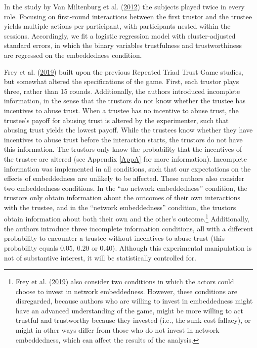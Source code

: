 \documentclass[
  11pt,
]{article}
\begin{document}
In the study by Van Miltenburg et al. (\protect\hyperlink{ref-miltenburg_buskens_triads_2012}{2012}) the subjects played twice in every role.
Focusing on first-round interactions between the first trustor and the trustee yields multiple actions per participant, with participants nested within the sessions.
Accordingly, we fit a logistic regression model with cluster-adjusted standard errors, in which the binary variables trustfulness and trustworthiness are regressed on the embeddedness condition.

Frey et al. (\protect\hyperlink{ref-frey_buskens_investments_2019}{2019}) built upon the previous Repeated Triad Trust Game studies, but somewhat altered the specifications of the game.
First, each trustor plays three, rather than 15 rounds.
Additionally, the authors introduced incomplete information, in the sense that the trustors do not know whether the trustee has incentives to abuse trust.
When a trustee has no incentive to abuse trust, the trustee's payoff for abusing trust is altered by the experimenter, such that abusing trust yields the lowest payoff.
While the trustees know whether they have incentives to abuse trust before the interaction starts, the trustors do not have this information.
The trustors only know the probability that the incentives of the trustee are altered (see Appendix \ref{AppA} for more information).
Incomplete information was implemented in all conditions, such that our expectations on the effects of embeddedness are unlikely to be affected.
These authors also consider two embeddedness conditions.
In the ``no network embeddedness'' condition, the trustors only obtain information about the outcomes of their own interactions with the trustee, and in the ``network embeddedness'' condition, the trustors obtain information about both their own and the other's outcome.\footnote{Frey et al. (\protect\hyperlink{ref-frey_buskens_investments_2019}{2019}) also consider two conditions in which the actors could choose to invest in network embeddedness. However, these conditions are disregarded, because authors who are willing to invest in embeddedness might have an advanced understanding of the game, might be more willing to act trustful and trustworthy because they invested (i.e., the sunk cost fallacy), or might in other ways differ from those who do not invest in network embeddedness, which can affect the results of the analysis.}
Additionally, the authors introduce three incomplete information conditions, all with a different probability to encounter a trustee without incentives to abuse trust (this probability equals \(0.05\), \(0.20\) or \(0.40\)).
Although this experimental manipulation is not of substantive interest, it will be statistically controlled for.
\end{document}
